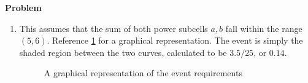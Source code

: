 \documentclass[12pt]{article}
\newenvironment{Ex}{\vspace{1.5em}\textbf{Problem}\\}{}
\begin{document}
\begin{enumerate}
\begin{Ex}
\begin{solution}
\begin{enumerate}
      \item This assumes that the sum of both power subcells $a,b$ fall
        within the range $(5,6)$. Reference \cref{fig:power-fig} for a
        graphical representation. The event is simply the shaded
        region between the two curves, calculated to be $3.5/25$, or $0.14$.
        \begin{figure}[Hb]
          \centering
          
          \caption{A graphical representation of the event requirements}
          \label{fig:power-fig}
        \end{figure}
      \end{enumerate}
    \end{solution}
  \end{Ex}
\end{enumerate}
\end{document}
